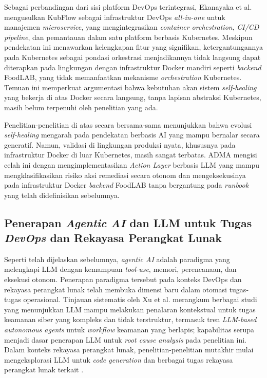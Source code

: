 Sebagai perbandingan dari sisi platform DevOps terintegrasi, Ekanayaka et al. \cite{ekanayaka2023kubflow} mengusulkan KubFlow sebagai infrastruktur DevOps \textit{all-in-one} untuk manajemen \textit{microservice}, yang mengintegrasikan \textit{container orchestration}, \textit{CI/CD pipeline}, dan pemantauan dalam satu platform berbasis Kubernetes. Meskipun pendekatan ini menawarkan kelengkapan fitur yang signifikan, ketergantungannya pada Kubernetes sebagai pondasi orkestrasi menjadikannya tidak langsung dapat diterapkan pada lingkungan dengan infrastruktur Docker mandiri seperti \textit{backend} FoodLAB, yang tidak memanfaatkan mekanisme \textit{orchestration} Kubernetes. Temuan ini memperkuat argumentasi bahwa kebutuhan akan sistem \textit{self-healing} yang bekerja di atas Docker secara langsung, tanpa lapisan abstraksi Kubernetes, masih belum terpenuhi oleh penelitian yang ada.

Penelitian-penelitian di atas secara bersama-sama menunjukkan bahwa evolusi \textit{self-healing} mengarah pada pendekatan berbasis AI yang mampu bernalar secara generatif. Namun, validasi di lingkungan produksi nyata, khususnya pada infrastruktur Docker di luar Kubernetes, masih sangat terbatas. ADMA mengisi celah ini dengan mengimplementasikan \textit{Action Layer} berbasis LLM yang mampu mengklasifikasikan risiko aksi remediasi secara otonom dan mengeksekusinya pada infrastruktur Docker \textit{backend} FoodLAB tanpa bergantung pada \textit{runbook} yang telah didefinisikan sebelumnya.

\subsection{Penerapan \textit{Agentic AI} dan LLM untuk Tugas \textit{DevOps} dan Rekayasa Perangkat Lunak}

Seperti telah dijelaskan sebelumnya, \textit{agentic AI} adalah paradigma yang melengkapi LLM dengan kemampuan \textit{tool-use}, memori, perencanaan, dan eksekusi otonom. Penerapan paradigma tersebut pada konteks DevOps dan rekayasa perangkat lunak telah membuka dimensi baru dalam otomasi tugas-tugas operasional. Tinjauan sistematis oleh Xu et al. \cite{xu2025large} merangkum berbagai studi yang menunjukkan LLM mampu melakukan penalaran kontekstual untuk tugas keamanan siber yang kompleks dan tidak terstruktur, termasuk tren \textit{LLM-based autonomous agents} untuk \textit{workflow} keamanan yang berlapis; kapabilitas serupa menjadi dasar penerapan LLM untuk \textit{root cause analysis} pada penelitian ini. Dalam konteks rekayasa perangkat lunak, penelitian-penelitian mutakhir mulai mengeksplorasi LLM untuk \textit{code generation} dan berbagai tugas rekayasa perangkat lunak terkait \cite{jiang2025survey}.

